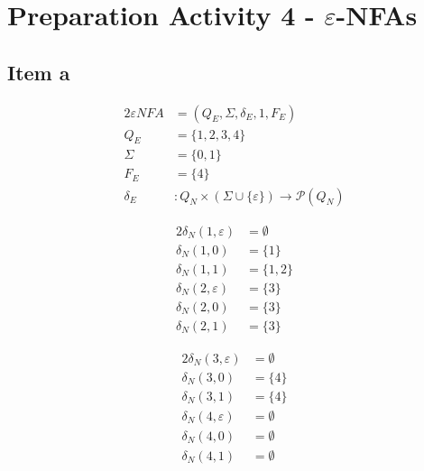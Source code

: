 \setcounter{section}{3}
\section{Preparation Activity 4 - \texorpdfstring{$\varepsilon$}{epsilon}-NFAs}
{
\renewcommand{\thesubsection}{\thesection.\alph{subsection}}
\subsection{Item a}
\begin{center}
\begin{minipage}[c]{0.35\textwidth}
	\begin{alignat*}{2}
		\varepsilon NFA    &= (Q_E, \Sigma, \delta_E, 1, F_E)\\
		Q_E    &= \{1,2,3,4\}\\
		\Sigma &= \{0,1\}\\
		F_E    &= \{4\}\\
		\delta_E &\colon Q_N \times (\Sigma\cup \{\varepsilon\}) \rightarrow \mathscr{P}(Q_N)
	\end{alignat*}
\end{minipage}%
\begin{minipage}[c]{0.25\textwidth}
	\begin{alignat*}{2}
		\delta_N(1,\varepsilon) &= \emptyset\\
		\delta_N(1,          0) &= \{1\}\\
		\delta_N(1,          1) &= \{1,2\}\\
		\delta_N(2,\varepsilon) &= \{3\}\\
		\delta_N(2,          0) &= \{3\}\\
		\delta_N(2,          1) &= \{3\}
	\end{alignat*}
\end{minipage}%
\begin{minipage}[c]{0.25\textwidth}
	\begin{alignat*}{2}
		\delta_N(3,\varepsilon) &= \emptyset\\
		\delta_N(3,          0) &= \{4\}\\
		\delta_N(3,          1) &= \{4\}\\
		\delta_N(4,\varepsilon) &= \emptyset\\
		\delta_N(4,          0) &= \emptyset\\
		\delta_N(4,          1) &= \emptyset
	\end{alignat*}
\end{minipage}
\end{center}
}
